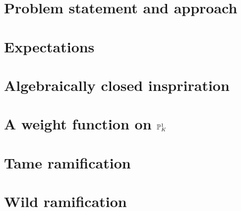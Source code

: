 \section{Problem statement and approach} \label{sec:problem_statement}


\section{Expectations} \label{sec:expectations}


\section{Algebraically closed inspriration} \label{sec:algebraically_closed_inspriration}


\section{ A weight function on $\mathbb{P}^{1}_K$} \label{sec:a_weight_function_on_pro^{1}_k}


\section{Tame ramification} \label{sec:if_mk}


\section{Wild ramification} \label{sec:wild_ramification}



